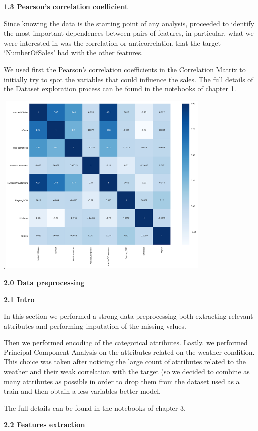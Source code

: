\documentclass[]{article}
\begin{document}
\textbf{1.3 Pearson's correlation coefficient}

Since knowing the data is the starting point of any analysis, proceeded
to identify the most important dependences between pairs of features, in
particular, what we were interested in was the correlation or
anticorrelation that the target `NumberOfSales' had with the other
features.

We used first the Pearson's correlation coefficients in the Correlation
Matrix to initially try to spot the variables that could influence the
sales. The full details of the Dataset exploration process can be found
in the notebooks of chapter 1.

.\includegraphics[width=4.02674in,height=3.51658in]{media/image3.png}

\textbf{2.0 Data preprocessing}

\textbf{2.1 Intro}

In this section we performed a strong data preprocessing both extracting
relevant attributes and performing imputation of the missing values.

Then we performed encoding of the categorical attributes. Lastly, we
performed Principal Component Analysis on the attributes related on the
weather condition. This choice was taken after noticing the large count
of attributes related to the weather and their weak correlation with the
target (so we decided to combine as many attributes as possible in order
to drop them from the dataset used as a train and then obtain a
less-variables better model.

The full details can be found in the notebooks of chapter 3.

\textbf{2.2 Features extraction}
\end{document}

